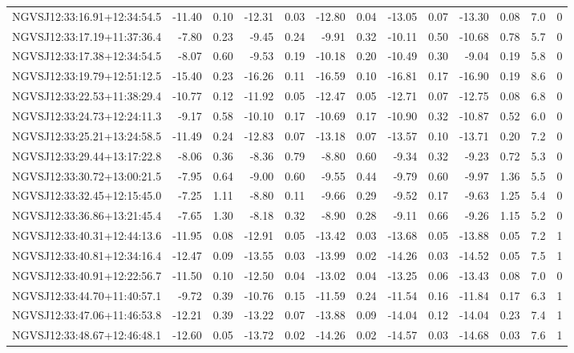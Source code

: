 \begin{tabular}{lrrrrrrrrrrcc}
NGVSJ12:33:16.91+12:34:54.5 & -11.40 & 0.10 & -12.31 & 0.03 & -12.80 & 0.04 & -13.05 & 0.07 & -13.30 & 0.08 & 7.0 & 0 \\
NGVSJ12:33:17.19+11:37:36.4 & -7.80 & 0.23 & -9.45 & 0.24 & -9.91 & 0.32 & -10.11 & 0.50 & -10.68 & 0.78 & 5.7 & 0 \\
NGVSJ12:33:17.38+12:34:54.5 & -8.07 & 0.60 & -9.53 & 0.19 & -10.18 & 0.20 & -10.49 & 0.30 & -9.04 & 0.19 & 5.8 & 0 \\
NGVSJ12:33:19.79+12:51:12.5 & -15.40 & 0.23 & -16.26 & 0.11 & -16.59 & 0.10 & -16.81 & 0.17 & -16.90 & 0.19 & 8.6 & 0 \\
NGVSJ12:33:22.53+11:38:29.4 & -10.77 & 0.12 & -11.92 & 0.05 & -12.47 & 0.05 & -12.71 & 0.07 & -12.75 & 0.08 & 6.8 & 0 \\
NGVSJ12:33:24.73+12:24:11.3 & -9.17 & 0.58 & -10.10 & 0.17 & -10.69 & 0.17 & -10.90 & 0.32 & -10.87 & 0.52 & 6.0 & 0 \\
NGVSJ12:33:25.21+13:24:58.5 & -11.49 & 0.24 & -12.83 & 0.07 & -13.18 & 0.07 & -13.57 & 0.10 & -13.71 & 0.20 & 7.2 & 0 \\
NGVSJ12:33:29.44+13:17:22.8 & -8.06 & 0.36 & -8.36 & 0.79 & -8.80 & 0.60 & -9.34 & 0.32 & -9.23 & 0.72 & 5.3 & 0 \\
NGVSJ12:33:30.72+13:00:21.5 & -7.95 & 0.64 & -9.00 & 0.60 & -9.55 & 0.44 & -9.79 & 0.60 & -9.97 & 1.36 & 5.5 & 0 \\
NGVSJ12:33:32.45+12:15:45.0 & -7.25 & 1.11 & -8.80 & 0.11 & -9.66 & 0.29 & -9.52 & 0.17 & -9.63 & 1.25 & 5.4 & 0 \\
NGVSJ12:33:36.86+13:21:45.4 & -7.65 & 1.30 & -8.18 & 0.32 & -8.90 & 0.28 & -9.11 & 0.66 & -9.26 & 1.15 & 5.2 & 0 \\
NGVSJ12:33:40.31+12:44:13.6 & -11.95 & 0.08 & -12.91 & 0.05 & -13.42 & 0.03 & -13.68 & 0.05 & -13.88 & 0.05 & 7.2 & 1 \\
NGVSJ12:33:40.81+12:34:16.4 & -12.47 & 0.09 & -13.55 & 0.03 & -13.99 & 0.02 & -14.26 & 0.03 & -14.52 & 0.05 & 7.5 & 1 \\
NGVSJ12:33:40.91+12:22:56.7 & -11.50 & 0.10 & -12.50 & 0.04 & -13.02 & 0.04 & -13.25 & 0.06 & -13.43 & 0.08 & 7.0 & 0 \\
NGVSJ12:33:44.70+11:40:57.1 & -9.72 & 0.39 & -10.76 & 0.15 & -11.59 & 0.24 & -11.54 & 0.16 & -11.84 & 0.17 & 6.3 & 1 \\
NGVSJ12:33:47.06+11:46:53.8 & -12.21 & 0.39 & -13.22 & 0.07 & -13.88 & 0.09 & -14.04 & 0.12 & -14.04 & 0.23 & 7.4 & 1 \\
NGVSJ12:33:48.67+12:46:48.1 & -12.60 & 0.05 & -13.72 & 0.02 & -14.26 & 0.02 & -14.57 & 0.03 & -14.68 & 0.03 & 7.6 & 1 \\

\end{tabular}
